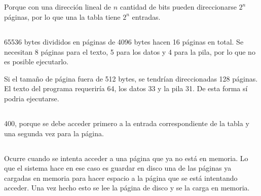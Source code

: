 \subsection{}

Porque con una dirección lineal de $n$ cantidad de bits pueden direccionarse
$2^n$ páginas, por lo que una la tabla tiene $2^n$ entradas.

\setcounter{subsection}{6}
\subsection{}

65536 bytes divididos en páginas de 4096 bytes hacen 16 páginas en total. Se
necesitan 8 páginas para el texto, 5 para los datos y 4 para la pila, por lo
que no es posible ejecutarlo.

Si el tamaño de página fuera de 512 bytes, se tendrían direccionadas 128
páginas. El texto del programa requeriría 64, los datos 33 y la pila 31. De
esta forma sí podria ejecutarse.

\subsection{}

\subsubsection{}

400, porque se debe acceder primero a la entrada correspondiente de la tabla y
una segunda vez para la página.

\subsection{}

Ocurre cuando se intenta acceder a una página que ya no está en memoria. Lo
que el sistema hace en ese caso es guardar en disco una de las páginas ya
cargadas en memoria para hacer espacio a la página que se está intentando
acceder. Una vez hecho esto se lee la página de disco y se la carga en
memoria.

\setcounter{subsection}{10}
\subsection{}

\subsubsection{}

